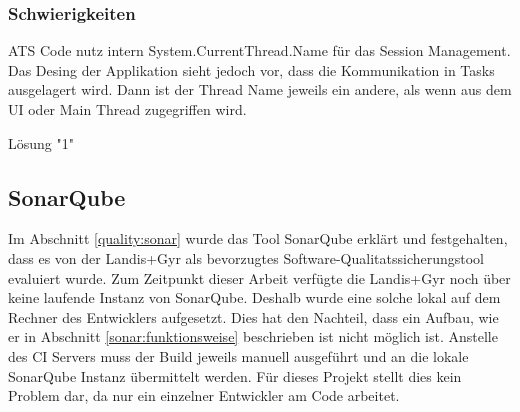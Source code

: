 \subsubsection{Schwierigkeiten}

ATS Code nutz intern System.CurrentThread.Name für das Session Management.
Das Desing der Applikation sieht jedoch vor, dass die Kommunikation in Tasks ausgelagert wird.
Dann ist der Thread Name jeweils ein andere, als wenn aus dem UI oder Main Thread zugegriffen wird.

Lösung "1"








\subsection{SonarQube}\label{s6:sonar}
Im Abschnitt \ref{quality:sonar} wurde das Tool SonarQube erklärt und festgehalten, dass es von der Landis+Gyr als bevorzugtes Software-Qualitatssicherungstool evaluiert wurde.
Zum Zeitpunkt dieser Arbeit verfügte die Landis+Gyr noch über keine laufende Instanz von SonarQube.
Deshalb wurde eine solche lokal auf dem Rechner des Entwicklers aufgesetzt.
Dies hat den Nachteil, dass ein Aufbau, wie er in Abschnitt \ref{sonar:funktionsweise} beschrieben ist nicht möglich ist.
Anstelle des \ac{CI} Servers muss der Build jeweils manuell ausgeführt und an die lokale SonarQube Instanz übermittelt werden.
Für dieses Projekt stellt dies kein Problem dar, da nur ein einzelner Entwickler am Code arbeitet.





